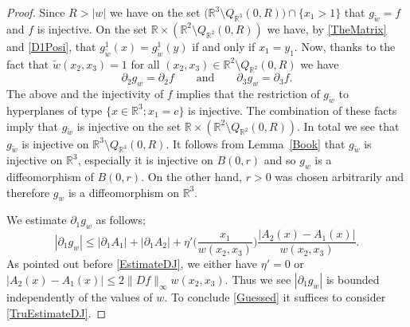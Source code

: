 \documentclass[10pt,a4paper]{amsart}
\def\er{\mathbb R}
\begin{document}
\begin{proof}
		Since $R > |w|$ we have on the set $\big(\er^3\setminus Q_{\er^3}(0,R)\big) \cap \{x_1>1\}$ that $g_{\tilde w} = f$ and $f$ is injective. On the set $\er\times(\er^2\setminus Q_{\er^2}(0,R))$ we have, by \eqref{TheMatrix} and  \eqref{D1Posi}, that $g_{\tilde{w}}^1(x) = g_{\tilde{w}}^1(y)$ if and only if $x_1 = y_1$. Now, thanks to the fact that $\tilde{w}(x_2,x_3) =1$ for all $(x_2,x_3)\in \er^2\setminus Q_{\er^2}(0,R)$ we have
		\begin{equation}\label{Sunlight}
			\partial_2 g_w = \partial_2f \qquad \text{and}\qquad \partial_3 g_w = \partial_3f.
		\end{equation}
		The above and the injectivity of $f$ implies that the restriction of $g_{\tilde{w}}$ to hyperplanes of type $\{x\in \er^3; x_1 = c\}$ is injective. The combination of these facts imply that $g_{\tilde{w}}$ is injective on the set $\er\times(\er^2\setminus Q_{\er^2}(0,R))$. In total we see that $g_{\tilde{w}}$ is injective on $\er^3\setminus Q_{\er^3}(0,R)$. It follows from Lemma~\ref{Book} that $g_{\tilde{w}}$ is injective on $\er^3$, especially it is injective on $B(0,r)$ and so $g_{w}$ is a diffeomorphism of $B(0,r)$. On the other hand, $r>0$ was chosen arbitrarily and therefore $g_w$ is a diffeomorphism on $\er^3$. 
		
		We estimate $\partial_1g_w$ as follows;
		$$
		|\partial_1g_w| \leq  |\partial_1 A_1|+ |\partial_1 A_2| +\eta'\Big(\frac{x_1}{w(x_2,x_3)}\Big)\frac{|A_2(x) - A_1(x)|}{w(x_2,x_3)}.
		$$
		As pointed out before \eqref{EstimateDJ}, we either have $\eta' = 0$ or $|A_2 (x) - A_1(x)|\leq 2\|Df\|_{\infty}w(x_2,x_3)$. Thus we see $|\partial_1g_w|$ is bounded independently of the values of $w$. To conclude \eqref{Guessed} it suffices to consider \eqref{TruEstimateDJ}. 
	\end{proof}
\end{document}
